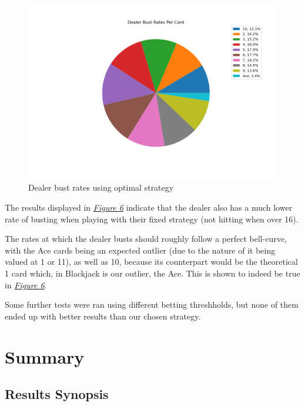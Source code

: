 \documentclass{article}
\begin{document}
{		\begin{figure}[H]
			\hypertarget{fig6}{}
			\begin{center}
				\includegraphics[width=15.5cm]{dealer-pie-chart-optimal.png}
				\caption{Dealer bust rates using optimal strategy}
			\end{center}
		\end{figure}

		The results displayed in \hyperlink{fig6}{\textit{Figure 6}} indicate that the dealer also has a much lower rate of busting
		when playing with their fixed strategy (not hitting when over 16). 

		The rates at which the dealer busts should roughly follow a perfect bell-curve, with the Ace cards being an expected outlier (due
		to the nature of it being valued at 1 or 11), as well as 10, because its counterpart would be the theoretical 1 card which, in Blackjack
		is our outlier, the Ace.
		This is shown to indeed be true in \hyperlink{fig6}{\textit{Figure 6}}.

		Some further tests were ran using different betting threshholds, but none of them ended up with better results than our chosen
		strategy.

        
\section{Summary}
\label{sec: Summary}

        \subsection{Results Synopsis}
	\label{Results Synopsis}

}
\end{document}

